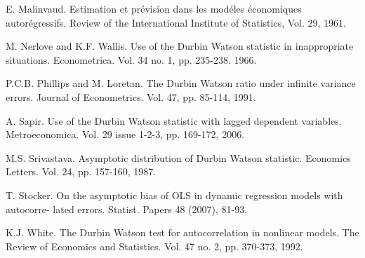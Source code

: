 \documentclass[article,12pt]{amsart}
\numberwithin{equation}{section}
\theoremstyle{plain}
\begin{document}
\begin{thebibliography}{00}
 E. Malinvaud. Estimation et pr\'evision dans les mod\'eles \'economiques autor\'egressifs. Review
of the International Institute of Statistics, Vol. 29, 1961.

 M. Nerlove and K.F. Wallis. Use of the Durbin Watson statistic in inappropriate situations. Econometrica. Vol. 34 no. 1, pp. 235-238. 1966.

 P.C.B. Phillips and M. Loretan. The Durbin Watson ratio under infinite variance errors. Journal of Econometrics. Vol. 47, pp. 85-114, 1991.

 A. Sapir. Use of the Durbin Watson statistic with lagged dependent variables. Metroeconomica. Vol. 29 issue 1-2-3, pp. 169-172, 2006.

 M.S. Srivastava. Asymptotic distribution of Durbin Watson statistic. Economics Letters. Vol. 24, pp. 157-160, 1987. 

 T. Stocker. On the asymptotic bias of OLS in dynamic regression models with autocorre-
lated errors. Statist. Papers 48 (2007), 81-93.

 K.J. White. The Durbin Watson test for autocorrelation in nonlinear models. The Review of Economics and Statistics. Vol. 47 no. 2, pp. 370-373, 1992.

\end{thebibliography}
\end{document}
